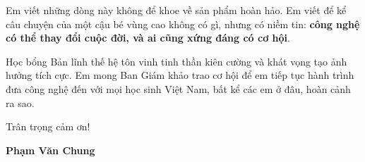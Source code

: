 \documentclass[12pt,a4paper]{article}
\begin{document}
Em viết những dòng này không để khoe về sản phẩm hoàn hảo. Em viết để kể câu chuyện của một cậu bé vùng cao không có gì, nhưng có niềm tin: \textbf{công nghệ có thể thay đổi cuộc đời, và ai cũng xứng đáng có cơ hội}.







Học bổng Bản lĩnh thế hệ tôn vinh tinh thần kiên cường và khát vọng tạo ảnh hưởng tích cực. Em mong Ban Giám khảo trao cơ hội để em tiếp tục hành trình đưa công nghệ đến với mọi học sinh Việt Nam, bất kể các em ở đâu, hoàn cảnh ra sao.









































Trân trọng cảm ơn!

\textbf{Phạm Văn Chung}
\end{document}
